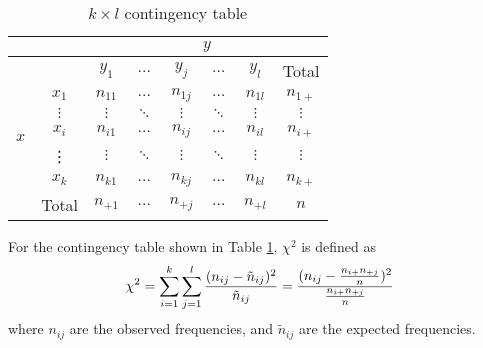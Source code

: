 \documentclass[
10pt, %
a4paper, %
]{report}
\begin{document}
\begin{table}[h]
\begin{center}
\begin{tabular}{|c|c|cccccc|}
\hline
 &  & \multicolumn{6}{c|}{\(y\)} \\ \hline
 &  & \multicolumn{1}{c|}{\(y_1\)} & \multicolumn{1}{c|}{\(\dots\)} & \multicolumn{1}{c|}{\(y_j\)} & \multicolumn{1}{c|}{\(\dots\)} & \multicolumn{1}{c|}{\(y_l\)} & Total \\ \hline
\multirow{5}{*}{\(x\)} & \(x_1\) & \multicolumn{1}{c|}{\(n_{11}\)} & \multicolumn{1}{c|}{\(\dots\)} & \multicolumn{1}{c|}{\(n_{1j}\)} & \multicolumn{1}{c|}{\(\dots\)} & \multicolumn{1}{c|}{\(n_{1l}\)} & \(n_{1+}\) \\ \cline{2-8} 
 & \(\vdots\) & \multicolumn{1}{c|}{\(\vdots\)} & \multicolumn{1}{c|}{\(\ddots\)} & \multicolumn{1}{c|}{\(\vdots\)} & \multicolumn{1}{c|}{\(\ddots\)} & \multicolumn{1}{c|}{\(\vdots\)} & \(\vdots\) \\ \cline{2-8} 
 & \(x_i\) & \multicolumn{1}{c|}{\(n_{i1}\)} & \multicolumn{1}{c|}{\(\dots\)} & \multicolumn{1}{c|}{\(n_{ij}\)} & \multicolumn{1}{c|}{\(\dots\)} & \multicolumn{1}{c|}{\(n_{il}\)} & \(n_{i+}\) \\ \cline{2-8} 
 & \vdots & \multicolumn{1}{c|}{\(\vdots\)} & \multicolumn{1}{c|}{\(\ddots\)} & \multicolumn{1}{c|}{\(\vdots\)} & \multicolumn{1}{c|}{\(\ddots\)} & \multicolumn{1}{c|}{\(\vdots\)} & \(\vdots\) \\ \cline{2-8} 
 & \(x_k\) & \multicolumn{1}{c|}{\(n_{k1}\)} & \multicolumn{1}{c|}{\(\dots\)} & \multicolumn{1}{c|}{\(n_{kj}\)} & \multicolumn{1}{c|}{\(\dots\)} & \multicolumn{1}{c|}{\(n_{kl}\)} & \(n_{k+}\) \\ \hline
 & Total & \multicolumn{1}{c|}{\(n_{+1}\)} & \multicolumn{1}{c|}{\(\dots\)} & \multicolumn{1}{c|}{\(n_{+j}\)} & \multicolumn{1}{c|}{\(\dots\)} & \multicolumn{1}{c|}{\(n_{+l}\)} & \(n\) \\ \hline
\end{tabular}
\end{center}
\caption{\(k\times l\) contingency table}
\label{tab:kxlcontingency}
\end{table}

For the contingency table shown in Table \ref{tab:kxlcontingency}, \(\chi^2\) is defined as
\[
\chi^2 = \sum_{i=1}^{k} \sum_{j=1}^{l} \frac{(n_{ij} - \tilde{n}_{ij})^2}{\tilde{n}_{ij}} = \frac{(n_{ij} - \frac{n_{i+}n_{+j}}{n})^2}{\frac{n_{i+}n_{+j}}{n}}
\]
where \(n_{ij}\) are the observed frequencies, and \(\tilde{n}_{ij}\) are the expected frequencies.
\end{document}
